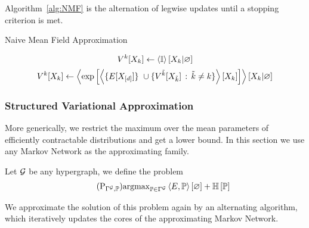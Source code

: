 Algorithm~\ref{alg:NMF} is the alternation of legwise updates until a stopping criterion is met.

\begin{algorithm}[h!]
\caption{Naive Mean Field Approximation}\label{alg:NMF}
\begin{algorithmic}
\For{$\catenumeratorin$}
	\State 
		\[ V^{k}[X_{k}] 
		\leftarrow \left\langle \mathbb{I}\right\rangle \left[ X_{k} | \varnothing \right]  \]
\EndFor
{}
	\For{$\catenumeratorin$}
		\State 
			\[ \legcoreofat{\catenumerator}{\catvariableof{\catenumerator}} 
			\algdefsymbol \normationof{ \expof{ \contractionof{ \{\energytensor[\shortcatvariables] \} \cup
				\{\legcoreofat{\seccatenumerator}{\catvariableof{\seccatenumerator}} \, : \, \seccatenumerator\neq\catenumerator\} }{\catvariableof{\catenumerator}} }
			}{\catvariableof{\catenumerator}} \]
\EndFor
\EndWhile
\end{algorithmic}
\end{algorithm}


\subsubsection{Structured Variational Approximation}

More generically, we restrict the maximum over the mean parameters of efficiently contractable distributions and get a lower bound.
In this section we use any Markov Network as the approximating family. 

Let $\mathcal{G}$ be any hypergraph, we define the problem
\begin{align}\tag{$\mathrm{P}_{\mnexpfamily, \probtensor}$}\label{prob:structuredApproximation}
	\argmax_{\probtensor\in \mnexpfamily} \sbcontraction{\energytensor,\probtensor} + \sentropyof{\probtensor}
\end{align}

We approximate the solution of this problem again by an alternating algorithm, which iteratively updates the cores of the approximating Markov Network. 

